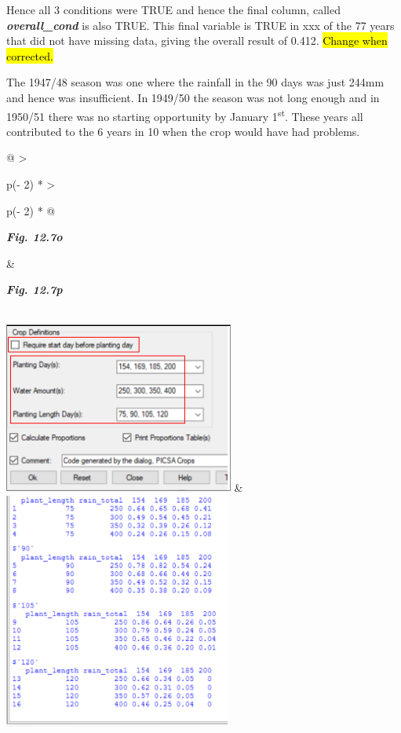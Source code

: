 \documentclass[
  letterpaper,
  DIV=11,
  numbers=noendperiod]{scrreprt}
\begin{document}
Hence all 3 conditions were TRUE and hence the final column, called
\textbf{\emph{overall\_cond}} is also TRUE. This final variable is TRUE
in xxx of the 77 years that did not have missing data, giving the
overall result of 0.412. \hl{Change when corrected.}

The 1947/48 season was one where the rainfall in the 90 days was just
244mm and hence was insufficient. In 1949/50 the season was not long
enough and in 1950/51 there was no starting opportunity by January
1\textsuperscript{st}. These years all contributed to the 6 years in 10
when the crop would have had problems.

\begin{longtable}[]{@{}
  >{\raggedright\arraybackslash}p{(\columnwidth - 2\tabcolsep) * }
  >{\raggedright\arraybackslash}p{(\columnwidth - 2\tabcolsep) * }@{}}
\toprule\noalign{}
\begin{minipage}[b]{\linewidth}\raggedright
\textbf{\emph{Fig. 12.7o}}
\end{minipage} & \begin{minipage}[b]{\linewidth}\raggedright
\textbf{\emph{Fig. 12.7p}}
\end{minipage} \\
\midrule\noalign{}
\endhead
\bottomrule\noalign{}
\endlastfoot
\includegraphics[width=2.97665in,height=2.22394in]{figures/Fig12.7o.png}
&
\includegraphics[width=2.93566in,height=3.06409in]{figures/Fig12.7p.png} \\
\end{longtable}
\end{document}
